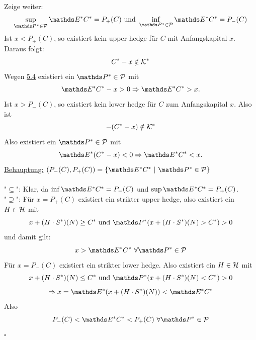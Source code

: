 Zeige weiter:
\[
\sup\limits_{\Pw^*\in\mc{P}}\E^*C^*=P_+(C) \text{ und } \inf\limits_{\Pw^*\in\mc{P}}\E^*C^*=P_-(C)
\]
Ist $x<P_+(C)$, so existiert kein upper hedge für $C$ mit Anfangskapital $x$.
Daraus folgt:
\[
C^*-x\notin \mathcal{K}^*
\]
Wegen \hyperref[sub:satz_4fima]{5.4} existiert ein $\Pw^*\in\mc{P}$ mit
\[
\E^*C^*-x>0\Rightarrow \E^*C^*>x.
\]
Ist $x>P_-(C)$, so existiert kein lower hedge für $C$ zum Anfangskapital $x$.
Also ist
\[
-(C^*-x)\notin \mathcal{K}^*
\]
Also existiert ein $\Pw^*\in\mc{P}$ mit 
\[
\E^*(C^*-x)<0 \Rightarrow \E^*C^*<x.
\]
\uline{Behauptung:}
$(P_-(C),P_+(C))=\penbrace{\E^*C^*~|~\Pw^*\in\mc{P}}$\\

\\
"$\subseteq$":
Klar, da $\inf \E^*C^*=P_-(C)$ und $\sup\E^*C^*=P_+(C)$.\\
"$\supseteq$":
Für $x=P_+(C)$ existiert ein strikter upper hedge, also existiert ein $H\in\mathcal{H}$ mit 
\[
x+(H\cdot S^*)(N)\ge C^* \text{ und }\Pw^*(x+(H\cdot S^*)(N)>C^*)>0
\]
und damit gilt:
\[
x>\E^*C^*~\forall \Pw^*\in\mc{P}
\]
Für $x=P_-(C)$ existiert ein strikter lower hedge.
Also existiert ein $H\in\mathcal{H}$ mit
\[
x+(H\cdot S^*)(N)\le C^* \text{ und } \Pw^*(x+(H\cdot S^*)(N)<C^*)>0
\]
\[
\Rightarrow x=\E^*(x+(H\cdot S^*)(N))<\E^*C^*
\]
Also
\[
P_-(C)<\E^*C^*<P_+(C)~\forall \Pw^*\in\mc{P}
\]
\hfill $\square$

